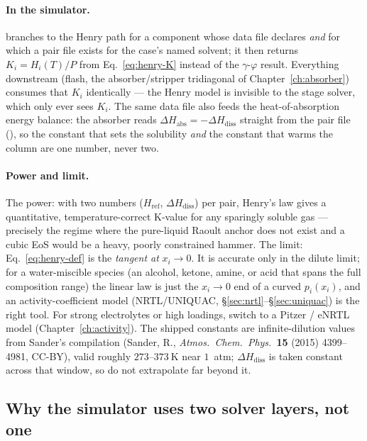 \documentclass[11pt,a4paper]{article}
\begin{document}
\paragraph{In the simulator.}   branches to
the Henry path for a component whose data file declares  \emph{and} for which a  pair file
exists for the case's named solvent; it then returns $K_i = H_i(T)/P$
from Eq.~\eqref{eq:henry-K} instead of the $\gamma$-$\varphi$ result.
Everything downstream (flash, the absorber/stripper tridiagonal of
Chapter~\ref{ch:absorber}) consumes that $K_i$ identically --- the
Henry model is invisible to the stage solver, which only ever sees
$K_i$.  The same data file also feeds the heat-of-absorption energy
balance: the absorber reads $\Delta H_{\mathrm{abs}} = -\Delta
H_{\mathrm{diss}}$ straight from the pair file
(), so the constant that sets the solubility
\emph{and} the constant that warms the column are one number, never
two.

\paragraph{Power and limit.}  The power: with two numbers
($H_{\mathrm{ref}}$, $\Delta H_{\mathrm{diss}}$) per pair, Henry's law
gives a quantitative, temperature-correct K-value for any sparingly
soluble gas --- precisely the regime where the pure-liquid Raoult
anchor does not exist and a cubic EoS would be a heavy, poorly
constrained hammer.  The limit: Eq.~\eqref{eq:henry-def} is the
\emph{tangent at} $x_i \to 0$.  It is accurate only in the dilute
limit; for a water-miscible species (an alcohol, ketone, amine, or
acid that spans the full composition range) the linear law is just the
$x_i \to 0$ end of a curved $p_i(x_i)$, and an activity-coefficient
model (NRTL/UNIQUAC, \S\ref{sec:nrtl}--\S\ref{sec:uniquac}) is the
right tool.  For strong electrolytes or high loadings, switch to a
Pitzer / eNRTL model (Chapter~\ref{ch:activity}).  The shipped
constants are infinite-dilution values from Sander's compilation
(Sander, R., \emph{Atmos.\ Chem.\ Phys.}\ \textbf{15} (2015)
4399--4981, CC-BY), valid roughly $273$--$373~\mathrm K$ near $1$~atm;
$\Delta H_{\mathrm{diss}}$ is taken constant across that window, so do
not extrapolate far beyond it.

\subsection{Why the simulator uses two solver layers, not one}
\end{document}
